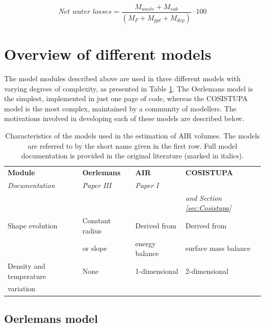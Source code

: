 \begin{equation} \textit{Net water losses} = \frac{M_{waste}+M_{sub}}{(M_F+M_{ppt}+M_{dep})} \cdot 100 \end{equation}

\section{Overview of different models}
\label{sec:MIP}

The model modules described above are used in three different models with varying degrees of complexity, as
presented in Table \ref{tab:MIP}. The Oerlemans model is the simplest, implemented in just one page of code, whereas
the COSISTUPA model is the most complex, maintained by a community of modellers. The motivations involved
in developing each of these models are described below.

\begin{table}[ht]
	\centering
  \caption{Characteristics of the models used in the estimation of \ac{AIR} volumes. The models are referred to by
  the short name given in the first row. Full model documentation is provided in the original literature (marked in
  italics). }      

	\label{tab:MIP}
	\begin{tabular}{|llll|}
		\hline
		\textbf{Module}        & \textbf{Oerlemans} & \textbf{AIR} & \textbf{COSISTUPA}     \\ 
		\textit{Documentation} & \textit{Paper III} & \textit{Paper I} & \textit{\citet{sauterCOSIPYV1Opensource2020}} \\ 
		                       &                    &                  & \textit{and Section \ref{sec:Cosistupa}}     \\ \hline
		Shape evolution        & Constant radius     & Derived from  & Derived from        \\
                           & or slope            & energy balance & surface mass balance        \\\hline
		Density and temperature& None & 1-dimensional   & 2-dimensional   \\
		variation              &           &        & \\ \hline
	\end{tabular}
\end{table}

\subsection{Oerlemans model}

